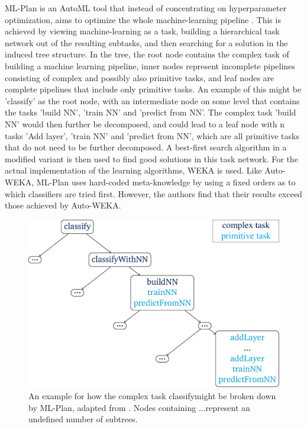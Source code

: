 ML-Plan is an AutoML tool that instead of concentrating on hyperparameter optimization, aims to optimize the whole machine-learning pipeline \cite{wever2017automatic}. This is achieved by viewing machine-learning as a task, building a hierarchical task network out of the resulting subtasks, and then searching for a solution in the induced tree structure. In the tree, the root node contains the complex task of building a machine learning pipeline, inner nodes represent incomplete pipelines consisting of complex and possibly also primitive tasks, and leaf nodes are complete pipelines that include only primitive tasks. An example of this might be 'classify' as the root node, with an intermediate node on some level that contains the tasks 'build NN', 'train NN' and 'predict from NN'. The complex task 'build NN' would then further be decomposed, and could lead to a leaf node with n tasks 'Add layer', 'train NN' and 'predict from NN', which are all primitive tasks that do not need to be further decomposed. A best-first search algorithm in a modified variant is then used to find good solutions in this task network. For the actual implementation of the learning algorithms, WEKA is used. Like Auto-WEKA, ML-Plan uses hard-coded meta-knowledge by using a fixed orders as to which classifiers are tried first. However, the authors find that their results exceed those achieved by Auto-WEKA.\\

\begin{figure}
\centering
\includegraphics[width=.8\textwidth]{gfx/MLPlan.pdf}
\caption{An example for how the complex task \textquotesingle classify\textquotesingle might be broken down by ML-Plan, adapted from \cite{wever2017automatic}. Nodes containing \textquotesingle ...\textquotesingle represent an undefined number of subtrees.}
\label{fig:mltree}
\end{figure}

